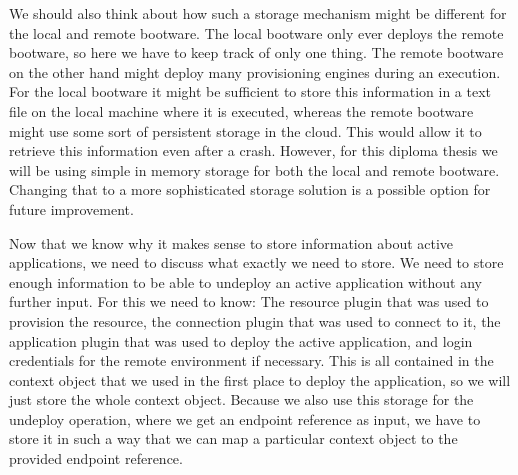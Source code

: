 We should also think about how such a storage mechanism might be different for the local and remote bootware.
The local bootware only ever deploys the remote bootware, so here we have to keep track of only one thing.
The remote bootware on the other hand might deploy many provisioning engines during an execution.
For the local bootware it might be sufficient to store this information in a text file on the local machine where it is executed, whereas the remote bootware might use some sort of persistent storage in the cloud.
This would allow it to retrieve this information even after a crash.
However, for this diploma thesis we will be using simple in memory storage for both the local and remote bootware.
Changing that to a more sophisticated storage solution is a possible option for future improvement.

Now that we know why it makes sense to store information about active applications, we need to discuss what exactly we need to store.
We need to store enough information to be able to undeploy an active application without any further input.
For this we need to know: The resource plugin that was used to provision the resource, the connection plugin that was used to connect to it, the application plugin that was used to deploy the active application, and login credentials for the remote environment if necessary.
This is all contained in the context object that we used in the first place to deploy the application, so we will just store the whole context object.
Because we also use this storage for the undeploy operation, where we get an endpoint reference as input, we have to store it in such a way that we can map a particular context object to the provided endpoint reference.
